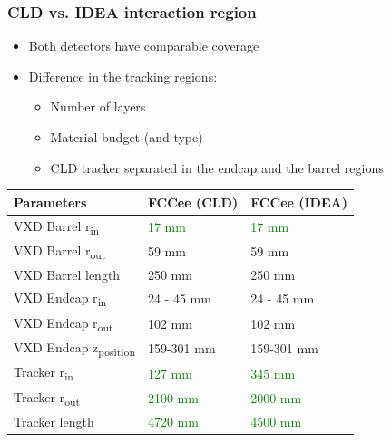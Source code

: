 \documentclass[aspectratio=169, hyperref={colorlinks=true,pdfpagelabels=false,linkcolor=black}, xcolor=dvipsnames,10pt]{beamer}
\begin{document}
\begin{frame}
	\frametitle{CLD vs. IDEA interaction region}

	\begin{itemize}
	\item Both detectors have comparable coverage
	\item Difference in the tracking regions:
		\begin{itemize}
		\item Number of layers
		\item Material budget (and type)
		\item CLD tracker separated in the endcap and the barrel regions
		\end{itemize}
	\end{itemize}
	
		\centering
	\begin{tabular}{l|l|l}
	Parameters & FCCee (CLD) & FCCee (IDEA) \\ \hline
	VXD Barrel r\textsubscript{in} & \textcolor{Green}{17 mm} & \textcolor{Green}{17 mm} \\
	VXD Barrel r\textsubscript{out} & 59 mm & 59 mm \\
	VXD Barrel length & 250 mm & 250 mm \\
	VXD Endcap r\textsubscript{in} & 24 - 45 mm & 24 - 45 mm \\
	VXD Endcap r\textsubscript{out} & 102 mm & 102 mm \\
	VXD Endcap z\textsubscript{position} & 159-301 mm & 159-301 mm \\
	Tracker r\textsubscript{in} & \textcolor{Green}{127 mm} & \textcolor{Green}{345 mm} \\
	Tracker r\textsubscript{out} & \textcolor{Green}{2100 mm} & \textcolor{Green}{2000 mm} \\
	Tracker length & \textcolor{Green}{4720 mm} & \textcolor{Green}{4500 mm} \\
	\end{tabular}

\end{frame}
\end{document}

